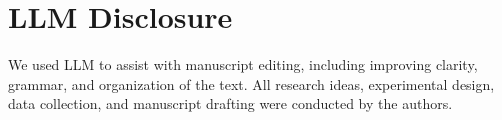 \documentclass{article} %
\begin{document}




\section*{LLM Disclosure}
We used LLM to assist with manuscript editing, including improving clarity, grammar, and organization of the text. All research ideas, experimental design, data collection, and manuscript drafting were conducted by the authors.
\end{document}
